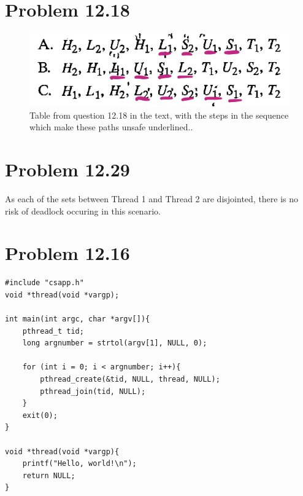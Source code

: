 \documentclass[12pt,letterpaper]{article}
\begin{document}
\section*{Problem 12.18}

\begin{figure}[!h]
    \centering
    \includegraphics[width=1\linewidth]{1218.jpg}
    \caption{Table from question 12.18 in the text, with the steps in the sequence which make these paths unsafe underlined..}
    \end{figure}
 
\section*{Problem 12.29}

As each of the sets between Thread 1 and Thread 2 are disjointed, there is no risk of deadlock occuring in this scenario.

\newpage
\section*{Problem 12.16}

\begin{verbatim}
#include "csapp.h"
void *thread(void *vargp);

int main(int argc, char *argv[]){
    pthread_t tid;
    long argnumber = strtol(argv[1], NULL, 0);

    for (int i = 0; i < argnumber; i++){
        pthread_create(&tid, NULL, thread, NULL);
        pthread_join(tid, NULL);
    }
    exit(0);
}

void *thread(void *vargp){
    printf("Hello, world!\n");
    return NULL;
}
\end{verbatim}
\end{document}
